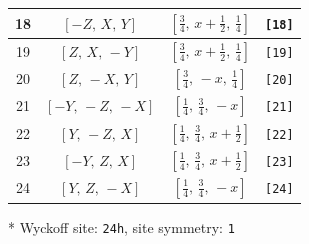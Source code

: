 \documentclass[fleqn,8pt]{jsarticle}
\begin{document}
\begin{longtable}{cccc}
18 & $\left[ - Z,\, X,\, Y \right]$ & $\left[ \frac{3}{4},\, x + \frac{1}{2},\, \frac{1}{4} \right]$ & {\tt [18]} \\ \hline
19 & $\left[ Z,\, X,\, - Y \right]$ & $\left[ \frac{3}{4},\, x + \frac{1}{2},\, \frac{1}{4} \right]$ & {\tt [19]} \\ \hline
20 & $\left[ Z,\, - X,\, Y \right]$ & $\left[ \frac{3}{4},\, - x,\, \frac{1}{4} \right]$ & {\tt [20]} \\ \hline
21 & $\left[ - Y,\, - Z,\, - X \right]$ & $\left[ \frac{1}{4},\, \frac{3}{4},\, - x \right]$ & {\tt [21]} \\ \hline
22 & $\left[ Y,\, - Z,\, X \right]$ & $\left[ \frac{1}{4},\, \frac{3}{4},\, x + \frac{1}{2} \right]$ & {\tt [22]} \\ \hline
23 & $\left[ - Y,\, Z,\, X \right]$ & $\left[ \frac{1}{4},\, \frac{3}{4},\, x + \frac{1}{2} \right]$ & {\tt [23]} \\ \hline
24 & $\left[ Y,\, Z,\, - X \right]$ & $\left[ \frac{1}{4},\, \frac{3}{4},\, - x \right]$ & {\tt [24]} \\
\end{longtable}
* Wyckoff site: {\tt 24h}, site symmetry: {\tt 1}
\renewcommand{\arraystretch}{1.2}
\end{document}
